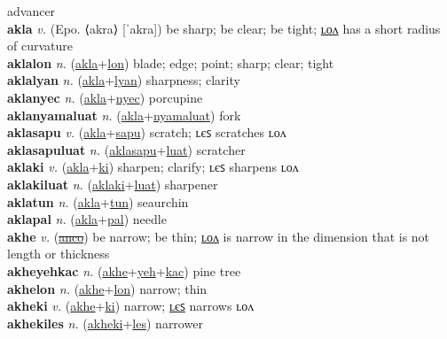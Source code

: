 advancer \label{akekiles} \\
\textbf{akla} \textit{v.} (Epo. ⟨akra⟩ [ˈakra])
be sharp; be clear; be tight; \hyperref[aklalon]{ʟᴏᴧ} has a short radius of curvature \label{akla} \\
\textbf{aklalon} \textit{n.} (\hyperref[akla]{akla}+\hyperref[lon]{lon})
blade; edge; point; sharp; clear; tight \label{aklalon} \\
\textbf{aklalyan} \textit{n.} (\hyperref[akla]{akla}+\hyperref[lyan]{lyan})
sharpness; clarity \label{aklalyan} \\
\textbf{aklanyec} \textit{n.} (\hyperref[akla]{akla}+\hyperref[nyec]{nyec})
porcupine \label{aklanyec} \\
\textbf{aklanyamaluat} \textit{n.} (\hyperref[akla]{akla}+\hyperref[nyamaluat]{nyamaluat})
fork \label{aklanyamaluat} \\
\textbf{aklasapu} \textit{v.} (\hyperref[akla]{akla}+\hyperref[sapu]{sapu})
scratch; ʟєꜱ scratches ʟᴏᴧ \label{aklasapu} \\
\textbf{aklasapuluat} \textit{n.} (\hyperref[aklasapu]{aklasapu}+\hyperref[luat]{luat})
scratcher \label{aklasapuluat} \\
\textbf{aklaki} \textit{v.} (\hyperref[akla]{akla}+\hyperref[ki]{ki})
sharpen; clarify; ʟєꜱ sharpens ʟᴏᴧ \label{aklaki} \\
\textbf{aklakiluat} \textit{n.} (\hyperref[aklaki]{aklaki}+\hyperref[luat]{luat})
sharpener \label{aklakiluat} \\
\textbf{aklatun} \textit{n.} (\hyperref[akla]{akla}+\hyperref[tun]{tun})
seaurchin \label{aklatun} \\
\textbf{aklapal} \textit{n.} (\hyperref[akla]{akla}+\hyperref[pal]{pal})
needle \label{aklapal} \\
\textbf{akhe} \textit{v.} (\hyperref[anco]{\sout{anco}})
be narrow; be thin; \hyperref[akhelon]{ʟᴏᴧ} is narrow in the dimension that is not length or thickness \label{akhe} \\
\textbf{akheyehkac} \textit{n.} (\hyperref[akhe]{akhe}+\hyperref[yeh]{yeh}+\hyperref[kac]{kac})
pine tree \label{akheyehkac} \\
\textbf{akhelon} \textit{n.} (\hyperref[akhe]{akhe}+\hyperref[lon]{lon})
narrow; thin \label{akhelon} \\
\textbf{akheki} \textit{v.} (\hyperref[akhe]{akhe}+\hyperref[ki]{ki})
narrow; \hyperref[akhekiles]{ʟєꜱ} narrows ʟᴏᴧ \label{akheki} \\
\textbf{akhekiles} \textit{n.} (\hyperref[akheki]{akheki}+\hyperref[les]{les})
narrower \label{akhekiles} \\
